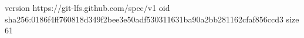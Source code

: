 version https://git-lfs.github.com/spec/v1
oid sha256:0186f4ff760818d349f2bee3e50adf530311631ba90a2bb281162cfaf856ccd3
size 61

